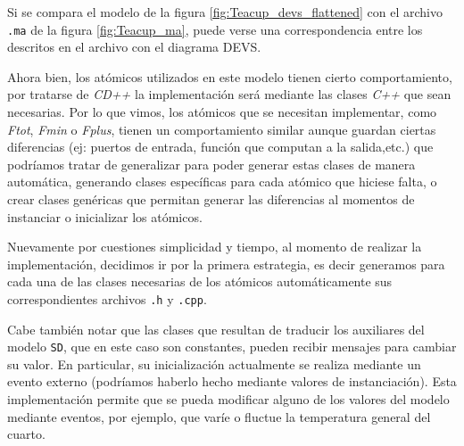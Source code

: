 Si se compara el modelo de la figura \ref{fig:Teacup_devs_flattened} con el archivo \texttt{.ma} de la figura \ref{fig:Teacup_ma}, puede verse una correspondencia entre los descritos en el archivo con el diagrama DEVS.

Ahora bien, los atómicos utilizados en este modelo tienen cierto comportamiento, por tratarse de \textit{CD++} la implementación será mediante las clases \textit{C++} que sean necesarias. Por lo que vimos, los atómicos que se necesitan implementar, como \textit{Ftot}, \textit{Fmin} o \textit{Fplus}, tienen un comportamiento similar aunque guardan ciertas diferencias (ej: puertos de entrada, función que computan a la salida,etc.) que podríamos tratar de generalizar para poder generar estas clases de manera automática, generando clases específicas para cada atómico que hiciese falta, o crear clases genéricas que permitan generar las diferencias al momentos de instanciar o inicializar los atómicos. 

Nuevamente por cuestiones simplicidad y tiempo, al momento de realizar la implementación, decidimos ir por la primera estrategia, es decir generamos para cada una de las clases necesarias de los atómicos automáticamente sus correspondientes archivos \texttt{.h} y \texttt{.cpp}.

Cabe también notar que las clases que resultan de traducir los auxiliares del modelo \texttt{SD}, que en este caso son constantes, pueden recibir mensajes para cambiar su valor. En particular, su inicialización actualmente se realiza mediante un evento externo (podríamos haberlo hecho mediante valores de instanciación). Esta implementación permite que se pueda modificar alguno de los valores del modelo mediante eventos, por ejemplo, que varíe o fluctue la temperatura general del cuarto.

